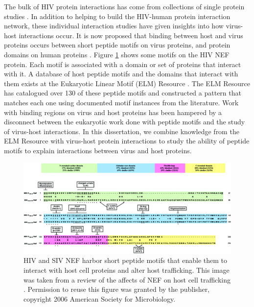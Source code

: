 The bulk of HIV protein interactions has come from collections of
single protein studies \cite{mendez2010global, chatr08, ptak08,
  driscoll2009pig}. In addition to helping to build the HIV-human
protein interaction network, these individual interaction studies have
given insights into how virus-host interactions occur. It is now
proposed that binding between host and virus proteins occurs between
short peptide motifs on virus proteins, and protein domains on human
proteins \cite{tonikian08,shelton08,kadaveru08}. Figure
\ref{fig:intro:nef} shows some motifs on the HIV NEF protein. Each
motif is associated with a domain or set of proteins that interact
with it. A database of host peptide motifs and the domains that
interact with them exists at the Eukaryotic Linear Motif (ELM)
Resource \cite{puntervoll03}. The ELM Resource has catalogued over 130
of these peptide motifs and constructed a pattern that matches each
one using documented motif instances from the literature.  Work with
binding regions on virus and host proteins has been hampered by a
disconnect between the eukaryotic work done with peptide motifs and
the study of virus-host interactions. In this dissertation, we combine
knowledge from the ELM Resource with virus-host protein interactions
to study the ability of peptide motifs to explain interactions between
virus and host proteins.

\begin{figure}
\begin{center}
\includegraphics[scale=0.25]{figs/intro_nef}
\end{center}
\caption[Host peptide motifs on HIV NEF]{\small HIV and SIV NEF harbor
  short peptide motifs that enable them to interact with host cell
  proteins and alter host trafficking. This image was taken from a
  review of the affects of NEF on host cell trafficking
  \cite{roeth06}. Permission to reuse this figure was granted by the
  publisher, copyright 2006 American Society for
  Microbiology. \label{fig:intro:nef}}
\end{figure}

